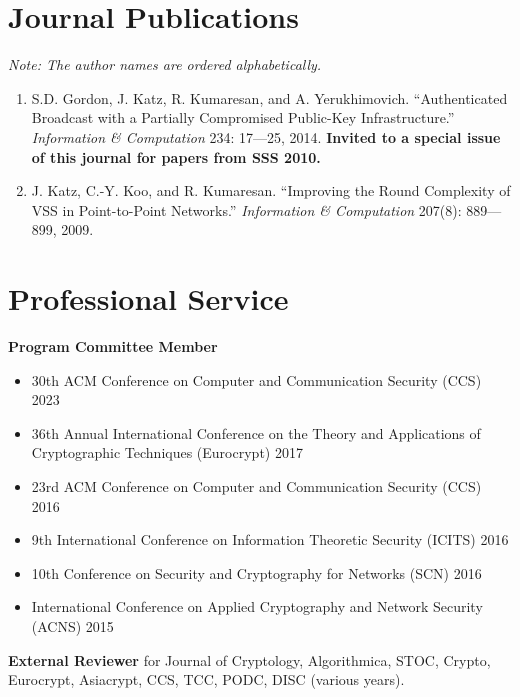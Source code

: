 \documentclass[11pt]{article}
\begin{document}
\section{Journal Publications}
\textit{Note: The author names are ordered alphabetically.}
\begin{enumerate}[leftmargin=*, itemsep=1pt]
    \item S.D. Gordon, J. Katz, R. Kumaresan, and A. Yerukhimovich. ``Authenticated Broadcast with a Partially Compromised Public-Key Infrastructure.'' \textit{Information \& Computation} 234: 17—25, 2014. \textbf{Invited to a special issue of this journal for papers from SSS 2010.}
    
    \item J. Katz, C.-Y. Koo, and R. Kumaresan. ``Improving the Round Complexity of VSS in Point-to-Point Networks.'' \textit{Information \& Computation} 207(8): 889—899, 2009.
\end{enumerate}

\section{Professional Service}
\textbf{Program Committee Member}
\begin{itemize}[leftmargin=*, noitemsep]
    \item 30th ACM Conference on Computer and Communication Security (CCS) 2023
    \item 36th Annual International Conference on the Theory and Applications of Cryptographic Techniques (Eurocrypt) 2017
    \item 23rd ACM Conference on Computer and Communication Security (CCS) 2016
    \item 9th International Conference on Information Theoretic Security (ICITS) 2016
    \item 10th Conference on Security and Cryptography for Networks (SCN) 2016
    \item International Conference on Applied Cryptography and Network Security (ACNS) 2015
\end{itemize}

\textbf{External Reviewer} for Journal of Cryptology, Algorithmica, STOC, Crypto, Eurocrypt, Asiacrypt, CCS, TCC, PODC, DISC (various years).
\end{document}

